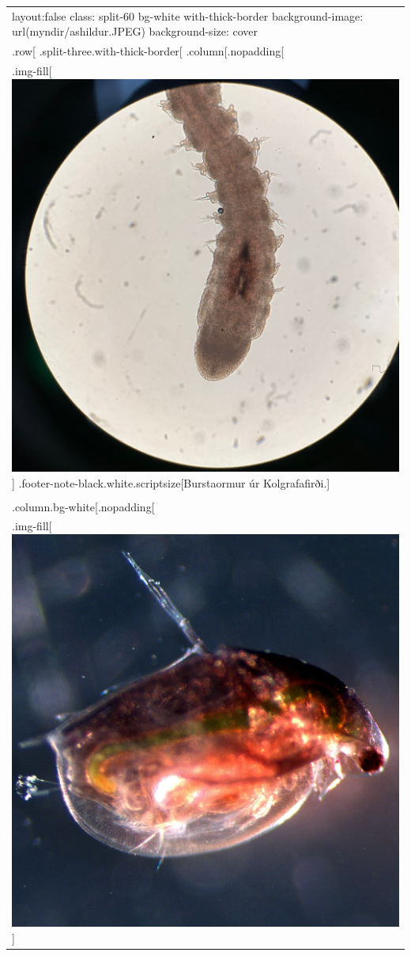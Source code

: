 \documentclass[
]{article}
\begin{document}
\begin{longtable}[]{@{}
  >{\raggedright\arraybackslash}p{}@{}}
\toprule
\endhead
layout:false class: split-60 bg-white with-thick-border
background-image: url(myndir/ashildur.JPEG) background-size: cover \\
.row{[} .split-three.with-thick-border{[} .column{[}.nopadding{[} \\
.img-fill{[}\includegraphics{myndir/burstaormur.jpeg}{]}
.footer-note-black.white.scriptsize{[}Burstaormur úr
Kolgrafafirði.{]} \\
{]}{]} \\
.column.bg-white{[}.nopadding{[} \\
.img-fill{[}\includegraphics{myndir/DAPHNIA_PULEX.JPG}{]}

\end{longtable}
\end{document}
